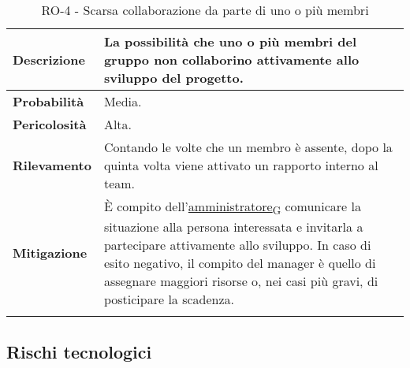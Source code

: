 \begin{longtable}{ | l | p{12cm} | }
	\hline
	\textbf{Descrizione}  & La possibilità che uno o più membri del gruppo non collaborino attivamente allo sviluppo del progetto.                                                                                                                                                                           \\
	\hline
	\textbf{Probabilità}  & Media.                                                                                                                                                                                                                                                                           \\
	\hline
	\textbf{Pericolosità} & Alta.                                                                                                                                                                                                                                                                            \\
	\hline
	\textbf{Rilevamento}  & Contando le volte che un membro è assente, dopo la quinta volta viene attivato un rapporto interno al team.                                                                                                                                                                      \\
	\hline
	\textbf{Mitigazione}  & È compito dell'\href{https://7last.github.io/docs/rtb/documentazione-interna/glossario\#amministratore}{amministratore\textsubscript{G}} comunicare la situazione alla persona interessata e invitarla a partecipare attivamente allo sviluppo. In caso di esito negativo, il compito del manager è quello di assegnare maggiori risorse o, nei casi più gravi, di posticipare la scadenza. \\
	\hline
	\caption{RO-4 - Scarsa collaborazione da parte di uno o più membri}
\end{longtable}



\subsection{Rischi tecnologici}


